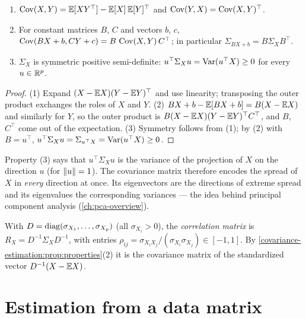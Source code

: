 \begin{notechapter}
\begin{proposition}\label{covariance-estimation:prop:properties}
\begin{enumerate}[nosep]
  \item $\operatorname{Cov}(X,Y) = \mathbb{E}[XY^\top] - \mathbb{E}[X]\,\mathbb{E}[Y]^\top$ and $\operatorname{Cov}(Y,X) = \operatorname{Cov}(X,Y)^\top$.
  \item For constant matrices $B$, $C$ and vectors $b$, $c$,
        $\operatorname{Cov}(BX + b, CY + c) = B\,\operatorname{Cov}(X,Y)\,C^\top$; in particular
        $\Sigma_{BX+b} = B\Sigma_XB^\top$.
  \item $\Sigma_X$ is symmetric positive semi-definite: $u^\top\Sigma_Xu = \operatorname{Var}(u^\top X)\geq0$
        for every $u\in\mathbb{R}^p$.
\end{enumerate}
\end{proposition}

\begin{proof}
(1) Expand $(X - \mathbb{E} X)(Y - \mathbb{E} Y)^\top$ and use linearity; transposing the outer
product exchanges the roles of $X$ and $Y$. (2) $BX + b - \mathbb{E}[BX + b] = B(X - \mathbb{E} X)$
and similarly for $Y$, so the outer product is
$B(X - \mathbb{E} X)(Y - \mathbb{E} Y)^\top C^\top$, and $B$, $C^\top$ come out of the
expectation. (3) Symmetry follows from (1); by (2) with $B = u^\top$,
$u^\top\Sigma_Xu = \Sigma_{u^\top X} = \operatorname{Var}(u^\top X)\geq0$.
\end{proof}

\begin{intuition}
Property (3) says that $u^\top\Sigma_Xu$ is the variance of the projection of $X$
on the direction $u$ (for $\left\|u\right\| = 1$). The covariance matrix therefore encodes
the spread of $X$ in \emph{every} direction at once. Its eigenvectors are the
directions of extreme spread and its eigenvalues the corresponding variances ---
the idea behind principal component analysis (\cref{ch:pca-overview}).
\end{intuition}

\begin{definition}
With $D = \operatorname{diag}(\sigma_{X_1},\dots,\sigma_{X_p})$ (all $\sigma_{X_i}>0$), the
\emph{correlation matrix} is $R_X = D^{-1}\Sigma_XD^{-1}$, with entries
$\rho_{ij} = \sigma_{X_iX_j}/(\sigma_{X_i}\sigma_{X_j})\in[-1,1]$. By
\cref{covariance-estimation:prop:properties}(2) it is the covariance matrix of
the standardized vector $D^{-1}(X - \mathbb{E} X)$.
\end{definition}

\section{Estimation from a data matrix}\label{covariance-estimation:sec:estimation}


\end{notechapter}
